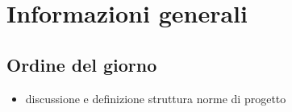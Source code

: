 \section{Informazioni generali}
    \def\modifiche { 
        {Data, 2020-12-09},
        {Ora inizio, 16:10},
        {Ora fine, 17:45},
        {Luogo, Discord},
        {Presenze, \unexpanded{
            \begin{itemize}
                \item Andrea Breggion;
                \item Matteo Falsetti;
                \item Alessandro Flori;
                \item Andrea Mascari;
                \item Diego Piola;
                \item Andrea Signori;
                \item Damiano Zanardo.
            \end{itemize}}
        },
    }
    

\subsection{Ordine del giorno}
\begin{itemize}
    \item discussione e definizione struttura norme di progetto
\end{itemize}